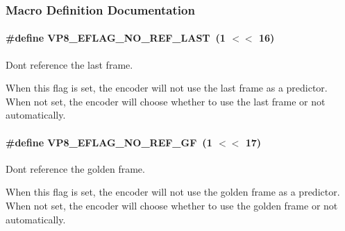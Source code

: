 \subsubsection{Macro Definition Documentation}
\paragraph[{\texorpdfstring{V\+P8\+\_\+\+E\+F\+L\+A\+G\+\_\+\+N\+O\+\_\+\+R\+E\+F\+\_\+\+L\+A\+ST}{VP8_EFLAG_NO_REF_LAST}}]{\setlength{\rightskip}{0pt plus 5cm}\#define V\+P8\+\_\+\+E\+F\+L\+A\+G\+\_\+\+N\+O\+\_\+\+R\+E\+F\+\_\+\+L\+A\+ST~(1 $<$$<$ 16)}\hypertarget{group__vp8__encoder_gafb51c67e5743275146bc1fc425727da3}{}\label{group__vp8__encoder_gafb51c67e5743275146bc1fc425727da3}


Don\textquotesingle{}t reference the last frame. 

When this flag is set, the encoder will not use the last frame as a predictor. When not set, the encoder will choose whether to use the last frame or not automatically. 
\paragraph[{\texorpdfstring{V\+P8\+\_\+\+E\+F\+L\+A\+G\+\_\+\+N\+O\+\_\+\+R\+E\+F\+\_\+\+GF}{VP8_EFLAG_NO_REF_GF}}]{\setlength{\rightskip}{0pt plus 5cm}\#define V\+P8\+\_\+\+E\+F\+L\+A\+G\+\_\+\+N\+O\+\_\+\+R\+E\+F\+\_\+\+GF~(1 $<$$<$ 17)}\hypertarget{group__vp8__encoder_gabb5e95343a2738abef44eca13059da33}{}\label{group__vp8__encoder_gabb5e95343a2738abef44eca13059da33}


Don\textquotesingle{}t reference the golden frame. 

When this flag is set, the encoder will not use the golden frame as a predictor. When not set, the encoder will choose whether to use the golden frame or not automatically. 
